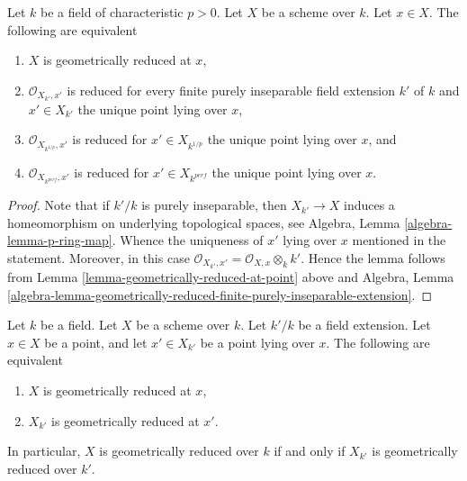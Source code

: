\begin{lemma}
\label{lemma-check-only-finite-inseparable-extensions}
Let $k$ be a field of characteristic $p > 0$. Let $X$ be a scheme over $k$.
Let $x \in X$. The following are equivalent
\begin{enumerate}
\item $X$ is geometrically reduced at $x$,
\item $\mathcal{O}_{X_{k'}, x'}$ is reduced for every
finite purely inseparable field extension $k'$ of $k$ and
$x' \in X_{k'}$ the unique point lying over $x$,
\item $\mathcal{O}_{X_{k^{1/p}}, x'}$ is reduced for
$x' \in X_{k^{1/p}}$ the unique point lying over $x$, and
\item $\mathcal{O}_{X_{k^{perf}}, x'}$ is reduced for
$x' \in X_{k^{perf}}$ the unique point lying over $x$.
\end{enumerate}
\end{lemma}

\begin{proof}
Note that if $k'/k$ is purely inseparable, then
$X_{k'} \to X$ induces a homeomorphism on underlying topological
spaces, see Algebra, Lemma \ref{algebra-lemma-p-ring-map}.
Whence the uniqueness of $x'$ lying over $x$ mentioned in the
statement. Moreover, in this case
$\mathcal{O}_{X_{k'}, x'} = \mathcal{O}_{X, x} \otimes_k k'$.
Hence the lemma follows from Lemma \ref{lemma-geometrically-reduced-at-point}
above and Algebra, Lemma
\ref{algebra-lemma-geometrically-reduced-finite-purely-inseparable-extension}.
\end{proof}

\begin{lemma}
\label{lemma-geometrically-reduced-upstairs}
Let $k$ be a field.
Let $X$ be a scheme over $k$.
Let $k'/k$ be a field extension.
Let $x \in X$ be a point, and let $x' \in X_{k'}$ be a point lying over $x$.
The following are equivalent
\begin{enumerate}
\item $X$ is geometrically reduced at $x$,
\item $X_{k'}$ is geometrically reduced at $x'$.
\end{enumerate}
In particular, $X$ is geometrically reduced over $k$ if and only if
$X_{k'}$ is geometrically reduced over $k'$.
\end{lemma}

